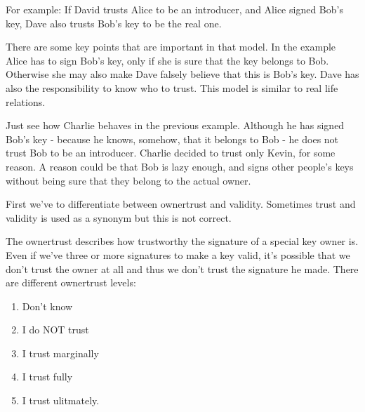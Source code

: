 For example: If David trusts Alice to be an introducer, and Alice signed
Bob's key, Dave also trusts Bob's key to be the real one.

There are some key points that are important in that model. In the example
Alice has to sign Bob's key, only if she is sure that the key belongs
to Bob. Otherwise she may also make Dave falsely believe that this
is Bob's key. Dave has also the responsibility to know who to trust.
This model is similar to real life relations.

Just see how Charlie behaves in the previous example. Although he has 
signed Bob's key - because he knows, somehow, that it belongs to Bob - 
he does not trust Bob to be an introducer. Charlie decided to trust only 
Kevin, for some reason. A reason could be that Bob is lazy enough, and 
signs other people's keys without being sure that they belong to the 
actual owner.

\par
First we've to differentiate between ownertrust and validity. Sometimes trust
and validity is used as a synonym but this is not correct.
\par
The ownertrust describes how trustworthy the signature of a special
key owner is. Even if we've three or more signatures to make a key valid,
it's possible that we don't trust the owner at all and thus we don't trust 
the signature he made. There are different ownertrust levels:
\begin{enumerate}
\item Don't know
\item I do NOT trust
\item I trust marginally
\item I trust fully
\item I trust ulitmately.
\end{enumerate}

